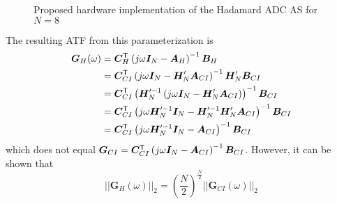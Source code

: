 \begin{sidewaysfigure}[htbp]
    \centering
    
    \caption{Proposed hardware implementation of the Hadamard ADC AS for $N=8$}
    \label{fig:HCI_AS_01}
\end{sidewaysfigure}

The resulting ATF from this parameterization is
\begin{align}
    \bm{G}_H(\omega) & = \bm{C}^\mathsf{T}_H \left( j\omega \bm{I}_{N} - \bm{A}_H \right)^{-1} \bm{B}_H \\
    & = \bm{C}^\mathsf{T}_{CI} \left( j\omega \bm{I}_{N} - \bm{H}'_N \bm{A}_{CI} \right)^{-1} \bm{H}'_N \bm{B}_{CI} \\
    & = \bm{C}^\mathsf{T}_{CI} \left(\bm{H}'^{-1}_N \left( j\omega \bm{I}_{N} - \bm{H}'_N \bm{A}_{CI} \right) \right)^{-1} \bm{B}_{CI} \\
    & = \bm{C}^\mathsf{T}_{CI} \left(j\omega \bm{H}'^{-1}_N \bm{I}_{N} - \bm{H}'^{-1}_N \bm{H}'_N \bm{A}_{CI} \right)^{-1} \bm{B}_{CI} \\
    & = \bm{C}^\mathsf{T}_{CI} \left(j\omega \bm{H}'^{-1}_N \bm{I}_{N} - \bm{A}_{CI} \right)^{-1} \bm{B}_{CI}
\end{align}
which does not equal $\bm{G}_{CI} = \bm{C}^\mathsf{T}_{CI} \left( j\omega \bm{I}_{N} - \bm{A}_{CI} \right)^{-1} \bm{B}_{CI}$.
However, it can be shown that
\begin{equation}
    ||\bm{G}_H(\omega)||_2 = \left( \frac{N}{2} \right)^{\frac{N}{2}}||\bm{G}_{CI}(\omega)||_2
\end{equation}

\begin{figure}[htbp]
    \centering
    
\end{figure}

\begin{figure}[htbp]
    \centering
    
\end{figure}

\begin{figure}[htbp]
    \centering
    
\end{figure}

\begin{figure}[htbp]
    \centering
    
\end{figure}

